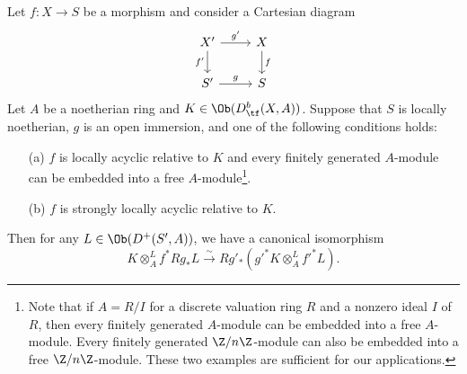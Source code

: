 \begin{proposition}\label{scheme locally ayclic morphism base change by open immersion isomorphism}
Let $f:X\to S$ be a morphism and consider a Cartesian diagram
\[\begin{tikzcd}
X'\ar[r,"g'"]\ar[d,swap,"f'"]&X\ar[d,"f"]\\
S'\ar[r,"g"]&S
\end{tikzcd}\]
Let $A$ be a noetherian ring and $K\in\Ob(D^b_{\tf}(X,A))$. Suppose that $S$ is locally noetherian, $g$ is an open immersion, and one of the following conditions holds:
\begin{enumerate}
    \item[(a)] $f$ is locally acyclic relative to $K$ and every finitely generated $A$-module can be embedded into a free $A$-module\footnote{Note that if $A=R/I$ for a discrete valuation ring $R$ and a nonzero ideal $I$ of $R$, then every finitely generated $A$-module can be embedded into a free $A$-module. Every finitely generated $\Z/n\Z$-module can also be embedded into a free $\Z/n\Z$-module. These two examples are sufficient for our applications.}.
    \item[(b)] $f$ is strongly locally acyclic relative to $K$.
\end{enumerate}
Then for any $L\in\Ob(D^+(S',A))$, we have a canonical isomorphism
\begin{equation}\label{scheme locally ayclic morphism base change by open immersion isomorphism-1}
K\otimes_A^Lf^*Rg_*L\stackrel{\sim}{\to} Rg'_*(g'^*K\otimes_A^Lf'^*L).
\end{equation}
\end{proposition}
